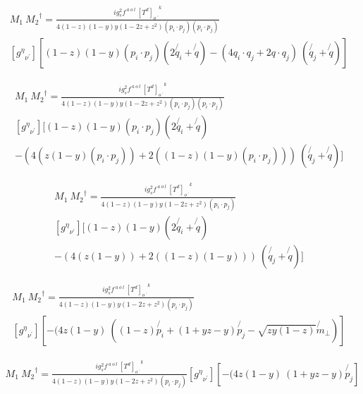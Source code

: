 \begin{equation}
\begin{split}
M_1\:{M_2}^{\dagger}=\frac{ig_s ^2 f^{\:a\:o\:l}\: {[T^d]_{o\:^{\prime}}}^k}{4(1-z)(1-y)y(1-2z+z^2)(p_i \cdot p_j)(p_i \cdot p_j)}\\
[{g^{{\eta}}}_{{\nu}^{\prime}}][(1-z)(1-y) (p_i \cdot p_j)(2\not{q_i} +\not{q})-(4q_i\cdot q_j +2q\cdot q_j)\:(\not{q_j} + \not{q})]
\end{split}
\end{equation}

\begin{equation}
\begin{split}
M_1\:{M_2}^{\dagger}=\frac{ig_s ^2 f^{\:a\:o\:l}\: {[T^d]_{o\:^{\prime}}}^k}{4(1-z)(1-y)y(1-2z+z^2)(p_i \cdot p_j)(p_i \cdot p_j)}\\
[{g^{{\eta}}}_{{\nu}^{\prime}}][(1-z)(1-y) (p_i \cdot p_j)(2\not{q_i}+\not{q})\\
-(4(z(1-y) (p_i \cdot p_j)) +2((1-z)(1-y) (p_i \cdot p_j)))\:(\not{q_j} + \not{q})]
\end{split}
\end{equation}

\begin{equation}
\begin{split}
M_1\:{M_2}^{\dagger}=\frac{ig_s ^2 f^{\:a\:o\:l}\: {[T^d]_{o\:^{\prime}}}^k}{4(1-z)(1-y)y(1-2z+z^2)(p_i \cdot p_j)}\\
[{g^{{\eta}}}_{{\nu}^{\prime}}][(1-z)(1-y) (2\not{q_i}+\not{q})\\
-(4(z(1-y)) +2((1-z)(1-y) ))\:(\not{q_j} + \not{q})]
\end{split}
\end{equation}

\begin{equation}
\begin{split}
M_1\:{M_2}^{\dagger}=\frac{ig_s ^2 f^{\:a\:o\:l}\: {[T^d]_{o\:^{\prime}}}^k}{4(1-z)(1-y)y(1-2z+z^2)(p_i \cdot p_j)}\\
[{g^{{\eta}}}_{{\nu}^{\prime}}][
-(4z(1-y)\:((1-z)\not{p_i} + (1+yz-y) \not{p_j} - \sqrt{zy(1-z)}\not{m}_{\bot})]
\end{split}
\end{equation}

\begin{equation}
\begin{split}
M_1\:{M_2}^{\dagger}=\frac{ig_s ^2 f^{\:a\:o\:l}\: {[T^d]_{o\:^{\prime}}}^k}{4(1-z)(1-y)y(1-2z+z^2)(p_i \cdot p_j)}
[{g^{{\eta}}}_{{\nu}^{\prime}}][
-(4z(1-y)\:(1+yz-y) \not{p_j}]
\end{split}
\end{equation}

